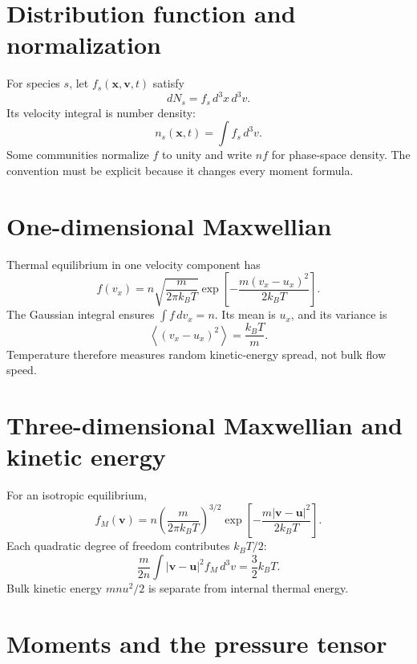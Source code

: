 \documentclass[11pt]{article}
\begin{document}
\section{Distribution function and normalization}

For species $s$, let $f_s(\mathbf x,\mathbf v,t)$ satisfy
\begin{equation}
dN_s=f_s\,d^3x\,d^3v.
\end{equation}
Its velocity integral is number density:
\begin{equation}
n_s(\mathbf x,t)=\int f_s\,d^3v.
\end{equation}
Some communities normalize $f$ to unity and write $nf$ for phase-space density. The convention must be explicit because it changes every moment formula.


\section{One-dimensional Maxwellian}

Thermal equilibrium in one velocity component has
\begin{equation}
f(v_x)=n\sqrt{\frac{m}{2\pi k_BT}}
\exp\left[-\frac{m(v_x-u_x)^2}{2k_BT}\right].
\end{equation}
The Gaussian integral ensures $\int f\,dv_x=n$. Its mean is $u_x$, and its variance is
\begin{equation}
\left\langle(v_x-u_x)^2\right\rangle=\frac{k_BT}{m}.
\end{equation}
Temperature therefore measures random kinetic-energy spread, not bulk flow speed.


\section{Three-dimensional Maxwellian and kinetic energy}

For an isotropic equilibrium,
\begin{equation}
f_M(\mathbf v)=n\left(\frac{m}{2\pi k_BT}\right)^{3/2}
\exp\left[-\frac{m|\mathbf v-\mathbf u|^2}{2k_BT}\right].
\end{equation}
Each quadratic degree of freedom contributes $k_BT/2$:
\begin{equation}
\frac{m}{2n}\int|\mathbf v-\mathbf u|^2f_M\,d^3v=\frac{3}{2}k_BT.
\end{equation}
Bulk kinetic energy $mn u^2/2$ is separate from internal thermal energy.


\section{Moments and the pressure tensor}
\end{document}

